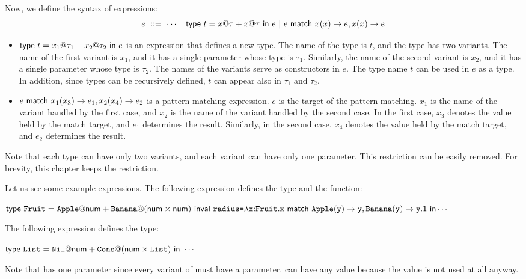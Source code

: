Now, we define the syntax of expressions:
\[
e \ ::= \ \cdots
\ |\ \textsf{type}\ t=x@\tau+x@\tau\ \textsf{in}\ e
\ |\ e\ \textsf{match}\ x(x)\rightarrow e,x(x)\rightarrow e
\]

\begin{itemize}
  \item $\textsf{type}\ t=x_1@\tau_1+x_2@\tau_2\ \textsf{in}\ e$ is an expression that defines a new
    type. The name of the type is $t$, and the type has two variants. The name
    of the first variant is $x_1$, and it has a single parameter whose type is
    $\tau_1$. Similarly, the name of the second variant is $x_2$, and it has a
    single parameter whose type is $\tau_2$. The names of the variants serve
    as constructors in $e$. The type name $t$ can be used in $e$ as a type. In
    addition, since types can be recursively defined, $t$ can appear also in
    $\tau_1$ and $\tau_2$.
  \item $e\ \textsf{match}\ x_1(x_3)\rightarrow e_1,x_2(x_4)\rightarrow e_2$ is a pattern matching
    expression. $e$ is the target of the pattern matching. $x_1$ is the name of
    the variant handled by the first case, and $x_2$ is the name of the variant
    handled by the second case. In the first case, $x_3$ denotes the value held
    by the match target, and $e_1$ determines the result. Similarly, in the
    second case, $x_4$ denotes the value held by the match target, and $e_2$
    determines the result.
\end{itemize}

Note that each type can have only two variants, and each variant can have only
one parameter. This restriction can be easily removed. For brevity, this
chapter keeps the restriction.

Let us see some example expressions. The following expression defines the
 type and the  function:

$
\textsf{type}\ \texttt{Fruit}=\texttt{Apple}@\textsf{num}+\texttt{Banana}@(\textsf{num}\times\textsf{num})\ \textsf{in}\ \\
\textsf{val}\ \texttt{radius}\texttt{=}\lambda\texttt{x}{:}\texttt{Fruit}.
  \texttt{x}\ \textsf{match}\ \texttt{Apple}(\texttt{y})\rightarrow \texttt{y},\texttt{Banana}(\texttt{y})\rightarrow \texttt{y}\textsf{.1}
\ \textsf{in}\ \\
\cdots
$

The following expression defines the  type:

$
\textsf{type}\ \texttt{List}=\texttt{Nil}@\textsf{num}+\texttt{Cons}@(\textsf{num}\times\texttt{List})\ \textsf{in}\ \cdots$

Note that  has one parameter since every variant of \Lang must have a
parameter.  can have any value because the value is not used at all anyway.

